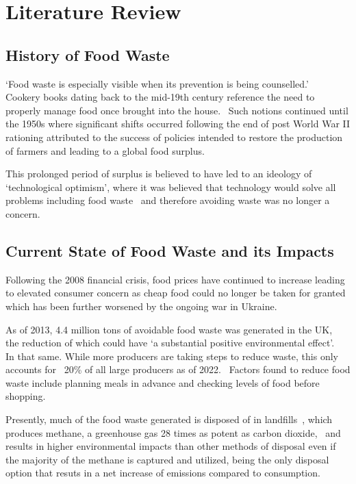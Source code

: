 \section{Literature Review}

\subsection{History of Food Waste}

\enquote*{Food waste is especially visible when its prevention is being counselled.}~\cite{evans_brief_2012}
Cookery books dating back to the mid-19th century reference the need to properly manage food once brought
into the house.~\cite{beeton_mrs_1907} Such notions continued until the 1950s where significant shifts
occurred following the end of post World War II rationing attributed to the success of policies intended
to restore the production of farmers and leading to a global food surplus.~\cite{evans_brief_2012}

This prolonged period of surplus is believed to have led to an ideology of \enquote*{technological optimism},
where it was believed that technology would solve all problems including food waste~\cite{krier_-easy_1985} and
therefore avoiding waste was no longer a concern.

\subsection{Current State of Food Waste and its Impacts}

Following the 2008 financial crisis, food prices have continued to increase leading to elevated consumer concern
as cheap food could no longer be taken for granted~\cite{evans_brief_2012} which has been further worsened by the
ongoing war in Ukraine.~\cite{ben_hassen_impacts_2022}

As of 2013, 4.4 million tons of avoidable food waste was generated in the UK,~\cite{quested_spaghetti_2013} the
reduction of which could have \enquote*{a substantial positive environmental effect}.~\cite{quested_spaghetti_2013}
In that same. While more producers are taking steps to reduce waste, this only accounts for ~20\% of all large producers
as of 2022.~\cite{wrap_food_2023} Factors found to reduce food waste include planning meals in advance and checking
levels of food before shopping.~\cite{quested_spaghetti_2013}

Presently, much of the food waste generated is disposed of in landfills~\cite{iacovidou_food_2012}, which produces
methane, a greenhouse gas 28 times as potent as carbon dioxide,~\cite{marmier_methane_2020} and results in higher
environmental impacts than other methods of disposal even if the majority of the methane is captured and utilized,
being the only disposal option that resuts in a net increase of emissions compared to consumption.~\cite{moult_greenhouse_2018}


